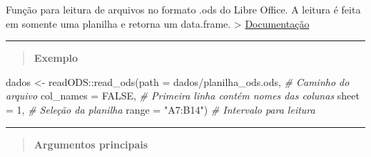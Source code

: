 \documentclass[
]{book}
\newenvironment{Shaded}{\begin{snugshade}}{\end{snugshade}}
\newcommand{\AttributeTok}[1]{\textcolor[rgb]{0.77,0.63,0.00}{#1}}
\newcommand{\CommentTok}[1]{\textcolor[rgb]{0.56,0.35,0.01}{\textit{#1}}}
\newcommand{\ConstantTok}[1]{\textcolor[rgb]{0.00,0.00,0.00}{#1}}
\newcommand{\DecValTok}[1]{\textcolor[rgb]{0.00,0.00,0.81}{#1}}
\newcommand{\FunctionTok}[1]{\textcolor[rgb]{0.00,0.00,0.00}{#1}}
\newcommand{\NormalTok}[1]{#1}
\newcommand{\OtherTok}[1]{\textcolor[rgb]{0.56,0.35,0.01}{#1}}
\newcommand{\SpecialCharTok}[1]{\textcolor[rgb]{0.00,0.00,0.00}{#1}}
\newcommand{\StringTok}[1]{\textcolor[rgb]{0.31,0.60,0.02}{#1}}
\theoremstyle{definition}
\theoremstyle{definition}
\theoremstyle{definition}
\theoremstyle{definition}
\theoremstyle{remark}
\begin{document}
Função para leitura de arquivos no formato .ods do Libre Office. A leitura é feita em somente uma planilha e retorna um data.frame.
\textgreater{} \href{https://www.rdocumentation.org/packages/readODS/versions/1.7.0/topics/read_ods}{Documentação}

\begin{center}\rule{0.5\linewidth}{0.5pt}\end{center}

\begin{quote}
\textbf{Exemplo}
\end{quote}

\begin{Shaded}
\begin{Highlighting}[]
\NormalTok{dados }\OtherTok{\textless{}{-}}\NormalTok{ readODS}\SpecialCharTok{::}\FunctionTok{read\_ods}\NormalTok{(}\AttributeTok{path =} \StringTok{\textquotesingle{}dados/planilha\_ods.ods\textquotesingle{}}\NormalTok{,  }\CommentTok{\# Caminho do arquivo}
                           \AttributeTok{col\_names =} \ConstantTok{FALSE}\NormalTok{,                }\CommentTok{\# Primeira linha contém nomes das colunas}
                           \AttributeTok{sheet =} \DecValTok{1}\NormalTok{,                        }\CommentTok{\# Seleção da planilha}
                           \AttributeTok{range =} \StringTok{"A7:B14"}\NormalTok{)                 }\CommentTok{\# Intervalo para leitura}
\end{Highlighting}
\end{Shaded}

\begin{center}\rule{0.5\linewidth}{0.5pt}\end{center}

\begin{quote}
\textbf{Argumentos principais}
\end{quote}
\end{document}

